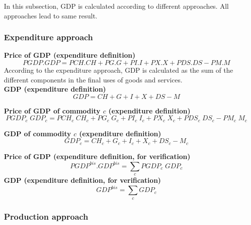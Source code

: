 \documentclass[12pt]{article}
\numberwithin{equation}{section}
\begin{document}
In this subsection, GDP is calculated according to different approaches. All approaches lead to same result.



\subsubsection{Expenditure approach}



\noindent \textbf{Price of GDP (expenditure definition)} 
\begin{dmath}
PGDP . GDP = PCH . CH + PG . G + PI . I + PX . X + PDS . DS - PM . M
\label{SU.mdlPGDP}
\end{dmath}
According to the expenditure approach, GDP is calculated as the sum of the different components in the final uses of goods and services. \\


\noindent \textbf{GDP (expenditure definition)} 
\begin{dmath}
GDP = CH + G + I + X + DS - M
\label{SU.mdlGDP}
\end{dmath}

\noindent \textbf{Price of GDP of commodity $c$ (expenditure definition)} 
\begin{dmath}
PGDP_{c} \; GDP_{c} = PCH_{c} \; CH_{c} + PG_{c} \; G_{c} + PI_{c} \; I_{c} + PX_{c} \; X_{c} + PDS_{c} \; DS_{c} - PM_{c} \; M_{c}
\label{SU.mdlPGDP[c]}
\end{dmath}

\noindent \textbf{GDP of commodity $c$ (expenditure definition)} 
\begin{dmath}
GDP_{c} = CH_{c} + G_{c} + I_{c} + X_{c} + DS_{c} - M_{c}
\label{SU.mdlGDP[c]}
\end{dmath}

\noindent \textbf{Price of GDP (expenditure definition, for verification)} 
\begin{dmath}
PGDP^{bis} . GDP^{bis} = \sum_{c} PGDP_{c} \; GDP_{c}
\label{SU.mdlPGDPbis}
\end{dmath}
\noindent \textbf{GDP (expenditure definition, for verification)} 
\begin{dmath}
GDP^{bis} = \sum_{c} GDP_{c}
\label{SU.mdlGDPbis}
\end{dmath}



\subsubsection{Production approach}
\end{document}
